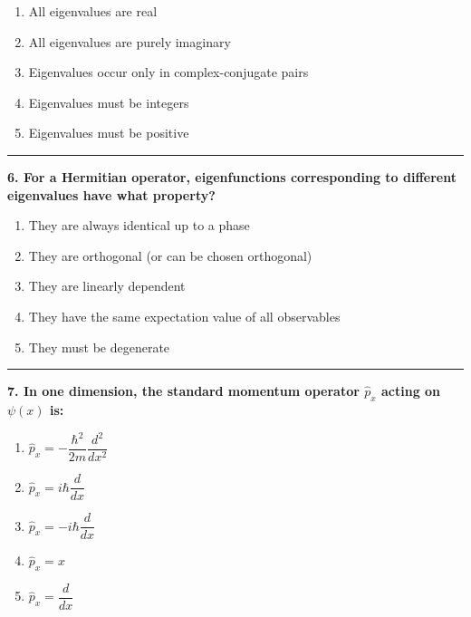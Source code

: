 \documentclass[
  english,
  9pt,
]{extbook}
\providecommand{\tightlist}{%
  \setlength{\itemsep}{0pt}\setlength{\parskip}{0pt}}
\theoremstyle{definition}
\theoremstyle{definition}
\theoremstyle{definition}
\theoremstyle{definition}
\theoremstyle{remark}
\begin{document}
\begin{enumerate}
\def\labelenumi{\alph{enumi}.}
\tightlist
\item
  All eigenvalues are real\\
\item
  All eigenvalues are purely imaginary\\
\item
  Eigenvalues occur only in complex-conjugate pairs\\
\item
  Eigenvalues must be integers\\
\item
  Eigenvalues must be positive
\end{enumerate}

\begin{center}\rule{0.5\linewidth}{0.5pt}\end{center}

\textbf{6. For a Hermitian operator, eigenfunctions corresponding to different eigenvalues have what property?}

\begin{enumerate}
\def\labelenumi{\alph{enumi}.}
\tightlist
\item
  They are always identical up to a phase
\item
  They are orthogonal (or can be chosen orthogonal)\\
\item
  They are linearly dependent\\
\item
  They have the same expectation value of all observables\\
\item
  They must be degenerate
\end{enumerate}

\begin{center}\rule{0.5\linewidth}{0.5pt}\end{center}

\textbf{7. In one dimension, the standard momentum operator \(\hat{p}_x\) acting on \(\psi(x)\) is:}

\begin{enumerate}
\def\labelenumi{\alph{enumi}.}
\tightlist
\item
  \(\hat{p}_x = -\dfrac{\hbar^2}{2m}\dfrac{d^2}{dx^2}\)\\
\item
  \(\hat{p}_x = i\hbar \dfrac{d}{dx}\)\\
\item
  \(\hat{p}_x = -i\hbar \dfrac{d}{dx}\)
\item
  \(\hat{p}_x = x\)\\
\item
  \(\hat{p}_x = \dfrac{d}{dx}\)
\end{enumerate}
\end{document}

